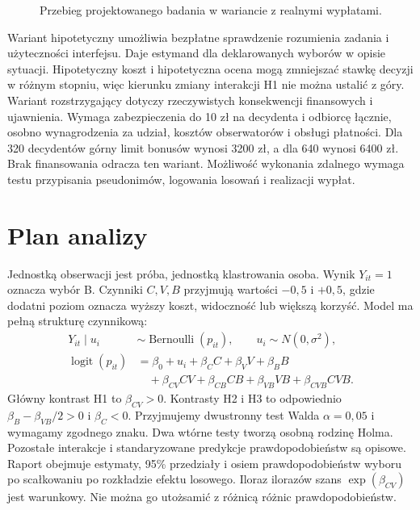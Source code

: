 \documentclass[11pt,a4paper]{article}
\begin{document}
\begin{figure}[htbp]
\centering
{}
\caption{Przebieg projektowanego badania w wariancie z realnymi wypłatami.}
\end{figure}

Wariant hipotetyczny umożliwia bezpłatne sprawdzenie rozumienia zadania i użyteczności interfejsu. Daje estymand dla deklarowanych wyborów w opisie sytuacji. Hipotetyczny koszt i hipotetyczna ocena mogą zmniejszać stawkę decyzji w różnym stopniu, więc kierunku zmiany interakcji H1 nie można ustalić z góry. Wariant rozstrzygający dotyczy rzeczywistych konsekwencji finansowych i ujawnienia. Wymaga zabezpieczenia do 10 zł na decydenta i odbiorcę łącznie, osobno wynagrodzenia za udział, kosztów obserwatorów i obsługi płatności. Dla 320 decydentów górny limit bonusów wynosi 3200 zł, a dla 640 wynosi 6400 zł. Brak finansowania odracza ten wariant. Możliwość wykonania zdalnego wymaga testu przypisania pseudonimów, logowania losowań i realizacji wypłat.

\section{Plan analizy}
Jednostką obserwacji jest próba, jednostką klastrowania osoba. Wynik $Y_{it}=1$ oznacza wybór B. Czynniki $C,V,B$ przyjmują wartości $-0{,}5$ i $+0{,}5$, gdzie dodatni poziom oznacza wyższy koszt, widoczność lub większą korzyść. Model ma pełną strukturę czynnikową:
\begin{align*}
Y_{it}\mid u_i&\sim \operatorname{Bernoulli}(p_{it}), \qquad u_i\sim N(0,\sigma^2),\\
\operatorname{logit}(p_{it})&=\beta_0+u_i+\beta_C C+\beta_V V+\beta_B B\\
&\quad+\beta_{CV}CV+\beta_{CB}CB+\beta_{VB}VB+\beta_{CVB}CVB .
\end{align*}
Główny kontrast H1 to $\beta_{CV}>0$. Kontrasty H2 i H3 to odpowiednio $\beta_B-\beta_{VB}/2>0$ i $\beta_C<0$. Przyjmujemy dwustronny test Walda $\alpha=0{,}05$ i wymagamy zgodnego znaku. Dwa wtórne testy tworzą osobną rodzinę Holma. Pozostałe interakcje i standaryzowane predykcje prawdopodobieństw są opisowe. Raport obejmuje estymaty, 95\% przedziały i osiem prawdopodobieństw wyboru po scałkowaniu po rozkładzie efektu losowego. Iloraz ilorazów szans $\exp(\beta_{CV})$ jest warunkowy. Nie można go utożsamić z różnicą różnic prawdopodobieństw.
\end{document}

